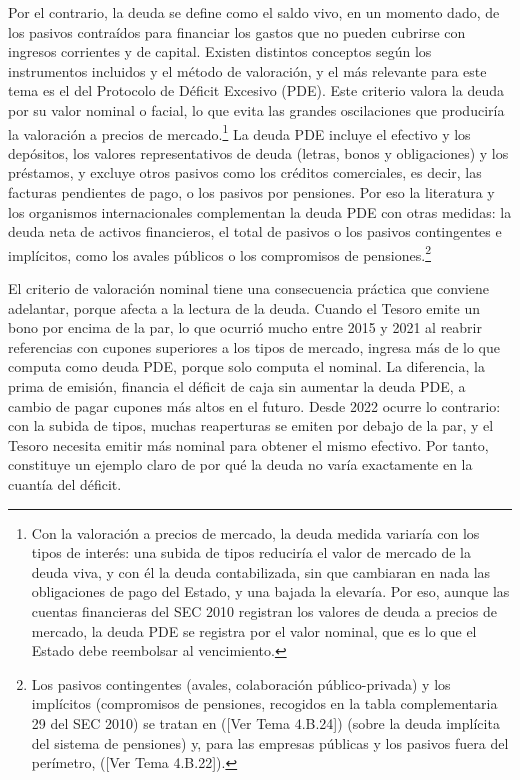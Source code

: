\documentclass[10pt,a4paper]{article}
\newcommand{\authorfont}[1]{{\fontfamily{EBGaramond-TLF}\selectfont #1}}
\begin{document}
Por el contrario, la deuda se define como el saldo vivo, en un momento dado, de los pasivos contraídos para financiar los gastos que no pueden cubrirse con ingresos corrientes y de capital. Existen distintos conceptos según los instrumentos incluidos y el método de valoración, y el más relevante para este tema es el del Protocolo de Déficit Excesivo (PDE). Este criterio valora la deuda por su valor nominal o facial, lo que evita las grandes oscilaciones que produciría la valoración a precios de mercado.\footnote{Con la valoración a precios de mercado, la deuda medida variaría con los tipos de interés: una subida de tipos reduciría el valor de mercado de la deuda viva, y con él la deuda contabilizada, sin que cambiaran en nada las obligaciones de pago del Estado, y una bajada la elevaría. Por eso, aunque las cuentas financieras del SEC 2010 registran los valores de deuda a precios de mercado, la deuda PDE se registra por el valor nominal, que es lo que el Estado debe reembolsar al vencimiento.
} La deuda PDE incluye el efectivo y los depósitos, los valores representativos de deuda (letras, bonos y obligaciones) y los préstamos, y excluye otros pasivos como los créditos comerciales, es decir, las facturas pendientes de pago, o los pasivos por pensiones. Por eso la literatura y los organismos internacionales complementan la deuda PDE con otras medidas: la deuda neta de activos financieros, el total de pasivos o los pasivos contingentes e implícitos, como los avales públicos o los compromisos de pensiones.\footnote{Los pasivos contingentes (avales, colaboración público-privada) y los implícitos (compromisos de pensiones, recogidos en la tabla complementaria 29 del SEC 2010) se tratan en ([\authorfont{Ver Tema 4.B.24}]) (sobre la deuda implícita del sistema de pensiones) y, para las empresas públicas y los pasivos fuera del perímetro, ([\authorfont{Ver Tema 4.B.22}]).
}

El criterio de valoración nominal tiene una consecuencia práctica que conviene adelantar, porque afecta a la lectura de la deuda. Cuando el Tesoro emite un bono por encima de la par, lo que ocurrió mucho entre 2015 y 2021 al reabrir referencias con cupones superiores a los tipos de mercado, ingresa más de lo que computa como deuda PDE, porque solo computa el nominal. La diferencia, la prima de emisión, financia el déficit de caja sin aumentar la deuda PDE, a cambio de pagar cupones más altos en el futuro. Desde 2022 ocurre lo contrario: con la subida de tipos, muchas reaperturas se emiten por debajo de la par, y el Tesoro necesita emitir más nominal para obtener el mismo efectivo. Por tanto, constituye un ejemplo claro de por qué la deuda no varía exactamente en la cuantía del déficit.
\end{document}
